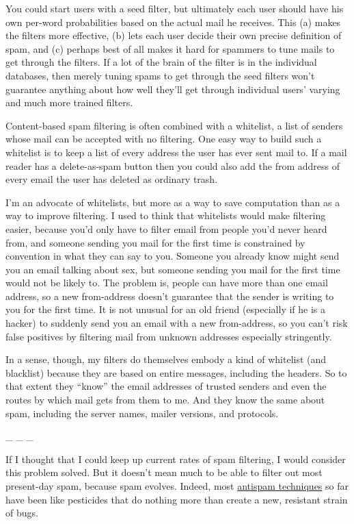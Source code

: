 You could start users with a seed filter, but ultimately each user
should have his own per-word probabilities based on the actual mail he
receives. This (a) makes the filters more effective, (b) lets each user
decide their own precise definition of spam, and (c) perhaps best of all
makes it hard for spammers to tune mails to get through the filters. If
a lot of the brain of the filter is in the individual databases, then
merely tuning spams to get through the seed filters won't guarantee
anything about how well they'll get through individual users' varying
and much more trained filters.

Content-based spam filtering is often combined with a whitelist, a list
of senders whose mail can be accepted with no filtering. One easy way to
build such a whitelist is to keep a list of every address the user has
ever sent mail to. If a mail reader has a delete-as-spam button then you
could also add the from address of every email the user has deleted as
ordinary trash.

I'm an advocate of whitelists, but more as a way to save computation
than as a way to improve filtering. I used to think that whitelists
would make filtering easier, because you'd only have to filter email
from people you'd never heard from, and someone sending you mail for the
first time is constrained by convention in what they can say to you.
Someone you already know might send you an email talking about sex, but
someone sending you mail for the first time would not be likely to. The
problem is, people can have more than one email address, so a new
from-address doesn't guarantee that the sender is writing to you for the
first time. It is not unusual for an old friend (especially if he is a
hacker) to suddenly send you an email with a new from-address, so you
can't risk false positives by filtering mail from unknown addresses
especially stringently.

In a sense, though, my filters do themselves embody a kind of whitelist
(and blacklist) because they are based on entire messages, including the
headers. So to that extent they ``know'' the email addresses of trusted
senders and even the routes by which mail gets from them to me. And they
know the same about spam, including the server names, mailer versions,
and protocols.

\_ \_ \_

If I thought that I could keep up current rates of spam filtering, I
would consider this problem solved. But it doesn't mean much to be able
to filter out most present-day spam, because spam evolves. Indeed, most
\href{falsepositives.html}{antispam techniques} so far have been like
pesticides that do nothing more than create a new, resistant strain of
bugs.

